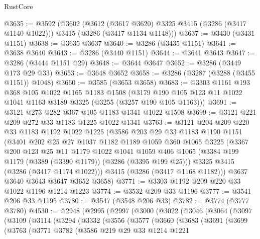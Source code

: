 \begin{lexlean}{RustCore}
\begin{coremodule}
@3635 := @3592
    (@3602
      (@3612 (@3617 @3620) @3325 @3415 (@3286 (@3417 @1140 @1022)))
      @3415
      (@3286 (@3417 @1134 @1148)))
@3637 := @3430 (@3431 @1151)
@3638 := @3635 @3637
@3640 := @3286 (@3435 @1151)
@3641 := @3638 @3640
@3643 := @3286 (@3440 @1151)
@3644 := @3641 @3643
@3647 := @3286 (@3444 @1151 @29)
@3648 := @3644 @3647
@3652 := @3286 (@3449 @173 @29 @33)
@3653 := @3648 @3652
@3658 := @3286 (@3287 (@3288 (@3455 @1151)) @1048)
@3660 := @3585 (@3653 @3658)
@3683 := @3303
    @1161
    @193
    @368
    @105
    @1022
    @1165
    @1183
    @1508
    (@3179 @190 @105 @123 @11 @1022 @1041 @1163 @3189 @3325 (@3255 (@3257 @190 @105 @1163)))
@3691 := @3121 @273 @282 @367 @105 @1183 @1341 @1022 @1508
@3699 := @3121 @221 @209 @272 @33 @1183 @1225 @1022 @1341
@3763 := @3121
    @204
    @209
    @220
    @33
    @1183
    @1192
    @1022
    @1225
    (@3586
      @203
      @29
      @33
      @1183
      @1190
      @1151
      (@3401
        @202
        @25
        @27
        @1037
        @1182
        @1189
        @1059
        @360
        @1065
        @3225
        (@3367
          @200
          @123
          @25
          @11
          @1179
          @1022
          @1041
          @1059
          @406
          @1065
          (@3384 @199 @1179 (@3389 (@3390 @1179)) (@3286 (@3395 @199 @25)))
          @3325
          @3415
          (@3286 (@3417 @1174 @1022)))
        @3415
        (@3286 (@3417 @1168 @1182)))
      @3637
      @3640
      @3643
      @3647
      @3652
      @3658)
@3771 := @3303 @1192 @209 @220 @33 @1022 @1196 @1214 @1223
@3774 := @3532 @209 @33 @1196
@3777 := @3541 @206 @33 @1195
@3780 := @3547 (@3548 @206 @33)
@3782 := @3774 (@3777 @3780)
@4530 := @2948
    (@2995
      (@2997
        (@3000
          (@3022
            (@3046
              (@3064
                (@3097
                  (@3109
                    (@3114
                      (@3294
                        (@3332
                          (@3556
                            (@3577
                              (@3660
                                (@3683
                                  (@3691
                                    (@3699
                                      (@3763
                                        (@3771
                                          @3782
                                          (@3586
                                            @219
                                            @29
                                            @33
                                            @1214
                                            @1221

\end{coremodule}
\end{lexlean}
